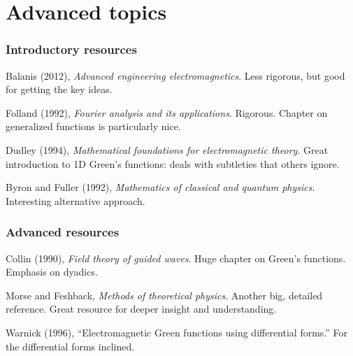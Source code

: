 \documentclass[12 pt, compress, handout, intlimits]{beamer}
\begin{document}
\section{Advanced topics}
\label{sec:advanced_topics}

\note{}


\begin{frame}[fragile]
    \frametitle{Introductory resources}
    Balanis (2012), \emph{Advanced engineering electromagnetics}. 
    Less rigorous, but good for getting the key ideas.

    Folland (1992), \emph{Fourier analysis and its applications}. 
    Rigorous. Chapter on generalized functions is particularly nice.

    Dudley (1994), \emph{Mathematical foundations for electromagnetic theory}.
    Great introduction to 1D Green's functions: deals with subtleties that others ignore.

    Byron and Fuller (1992), \emph{Mathematics of classical and quantum physics}.
    Interesting alternative approach.
    
\end{frame}

\note{}

\begin{frame}[fragile]
    \frametitle{Advanced resources}
    Collin (1990), \emph{Field theory of guided waves}. 
    Huge chapter on Green's functions. Emphasis on dyadics.

    Morse and Feshback, \emph{Methods of theoretical physics}.
    Another big, detailed reference. Great resource for deeper insight and understanding.

    Warnick (1996), ``Electromagnetic Green functions using differential forms.''
    For the differential forms inclined.

\end{frame}    

\note{}
\end{document}
